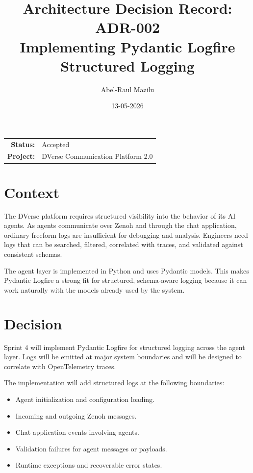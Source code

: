 \documentclass[11pt]{article}
\title{Architecture Decision Record: ADR-002\\
\large Implementing Pydantic Logfire Structured Logging}
\author{Abel-Raul Mazilu}
\date{13-05-2026}
\begin{document}
\maketitle

\begin{center}
\begin{tabular}{rl}
\textbf{Status:} & Accepted \\
\textbf{Project:} & DVerse Communication Platform 2.0 \\
\end{tabular}
\end{center}

\section{Context}

The DVerse platform requires structured visibility into the behavior of its AI agents. As agents communicate over Zenoh and through the chat application, ordinary freeform logs are insufficient for debugging and analysis. Engineers need logs that can be searched, filtered, correlated with traces, and validated against consistent schemas.

The agent layer is implemented in Python and uses Pydantic models. This makes Pydantic Logfire a strong fit for structured, schema-aware logging because it can work naturally with the models already used by the system.

\section{Decision}

Sprint 4 will implement Pydantic Logfire for structured logging across the agent layer. Logs will be emitted at major system boundaries and will be designed to correlate with OpenTelemetry traces.

The implementation will add structured logs at the following boundaries:

\begin{itemize}
    \item Agent initialization and configuration loading.
    \item Incoming and outgoing Zenoh messages.
    \item Chat application events involving agents.
    \item Validation failures for agent messages or payloads.
    \item Runtime exceptions and recoverable error states.
\end{itemize}
\end{document}
